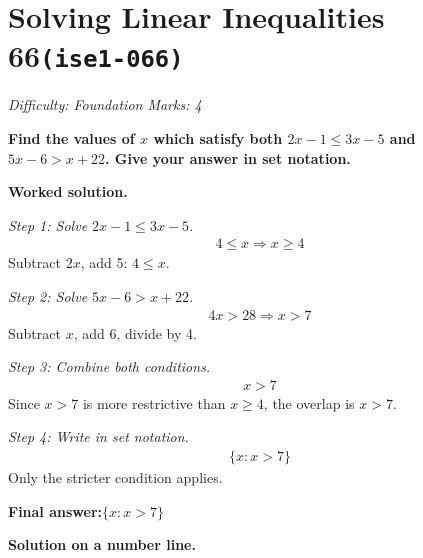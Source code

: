 \documentclass[11pt]{article}
\newcommand{\question}[1]{\par\medskip\noindent\textbf{#1}\par}
\begin{document}
\section*{Solving Linear Inequalities 66\quad\small\texttt{(ise1-066)}}
\textit{Difficulty: Foundation \quad\textbar\quad Marks: 4}

\question{Find the values of \( x \) which satisfy both \( 2x - 1 \leq 3x - 5 \) and \( 5x - 6 > x + 22 \). Give your answer in set notation.}

\textbf{Worked solution.}

\textit{Step 1: Solve \( 2x - 1 \leq 3x - 5 \).}
\[\begin{gathered}
4 \leq x \Rightarrow x \geq 4
\end{gathered}\]
Subtract \( 2x \), add 5: \( 4 \leq x \).

\textit{Step 2: Solve \( 5x - 6 > x + 22 \).}
\[\begin{gathered}
4x > 28 \Rightarrow x > 7
\end{gathered}\]
Subtract \( x \), add 6, divide by 4.

\textit{Step 3: Combine both conditions.}
\[\begin{gathered}
x > 7
\end{gathered}\]
Since \( x > 7 \) is more restrictive than \( x \geq 4 \), the overlap is \( x > 7 \).

\textit{Step 4: Write in set notation.}
\[\begin{gathered}
\{x : x > 7\}
\end{gathered}\]
Only the stricter condition applies.

\begin{answerbox}
\textbf{Final answer:}\quad \(\displaystyle  \{x : x > 7\} \)
\end{answerbox}
\textbf{Solution on a number line.}
\end{document}
